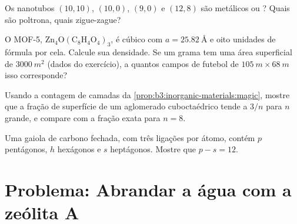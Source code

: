 \begin{exercise}[$\star\star$]\label{exo:b3:inorganic-materials:9}
Os nanotubos $(10, 10)$, $(10, 0)$, $(9, 0)$ e $(12, 8)$ são metálicos ou ? Quais
são poltrona, quais zigue-zague?
\end{exercise}

\begin{exercise}[$\star\star\star$]\label{exo:b3:inorganic-materials:10}
O MOF-5, $\mathrm{Zn_4O(C_8H_4O_4)_3}$, é cúbico com $a = \qty{25.82}{\angstrom}$ e oito unidades de fórmula por cela.
Calcule sua densidade. Se um grama tem uma área superficial de $\qty{3000}{m^2}$ (dados do
exercício), a quantos campos de futebol de $\qty{105}{m} \times \qty{68}{m}$ isso corresponde?
\end{exercise}

\begin{exercise}[$\star\star\star$]\label{exo:b3:inorganic-materials:11}
Usando a contagem de camadas da \cref{prop:b3:inorganic-materials:magic}, mostre que a
fração de superfície de um aglomerado cuboctaédrico tende a $3/n$ para $n$ grande, e
compare com a fração exata para $n = 8$.
\end{exercise}

\begin{exercise}[$\star\star\star$]\label{exo:b3:inorganic-materials:12}
Uma gaiola de carbono fechada, com três ligações por átomo, contém $p$ pentágonos, $h$ hexágonos
e $s$ heptágonos. Mostre que $p - s = 12$.
\end{exercise}

\section{Problema: Abrandar a água com a zeólita A}

